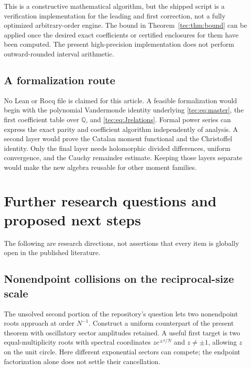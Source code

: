 \documentclass[11pt,a4paper]{article}
\numberwithin{equation}{section}
\theoremstyle{definition}
\theoremstyle{remark}
\begin{document}
This is a constructive mathematical algorithm, but the shipped script
is a verification implementation for the leading and first correction,
not a fully optimized arbitrary-order engine. The bound in
Theorem~\ref{tec:thm:bound} can be applied once the desired exact coefficients
or certified enclosures for them have been computed. The present
high-precision implementation does not perform outward-rounded interval
arithmetic.

\subsection{A formalization route}
No Lean or Rocq file is claimed for this article. A feasible formalization
would begin with the polynomial Vandermonde identity underlying
\eqref{tec:eq:master}, the first coefficient table over $\mathbb Q$, and
\eqref{tec:eq:Jrelations}. Formal power series can express the exact
parity and coefficient algorithm independently of analysis. A second
layer would prove the Catalan moment functional and the Christoffel
identity. Only the final layer needs holomorphic divided differences,
uniform convergence, and the Cauchy remainder estimate. Keeping those
layers separate would make the new algebra reusable for other moment
families.

\section{Further research questions and proposed next steps}\label{tec:sec:future}
The following are research directions, not assertions that every item
is globally open in the published literature.

\subsection{Nonendpoint collisions on the reciprocal-size scale}\label{tec:x:q1}
The unsolved second portion of the repository's question lets two
nonendpoint roots approach at order $N^{-1}$. Construct a uniform
counterpart of the present theorem with oscillatory sector amplitudes
retained. A useful first target is two equal-multiplicity roots with
spectral coordinates $z e^{\pm\tau/N}$ and $z\ne\pm1$, allowing $z$
on the unit circle. Here different exponential sectors can compete;
the endpoint factorization alone does not settle their cancellation.

\noindent[Added 29 September 2026, batch 55: answered by Part~V
(Theorems~\ref{ic:thm:main} and~\ref{ic:thm:pair}), in the centred
coordinates $2+2\cos(\theta\pm\tau/(N+t))$, with $z=e^{i\theta}$ on the unit
circle and the oscillatory sectors retained; off the circle one sector
dominates exponentially.  In the coordinates $ze^{\pm\tau/N}$ proposed here
the $N^{-1}$ term gains a non-oscillatory summand
(Remark~\ref{ic:rem:coordinates}, an observation of this merge).]
\end{document}
